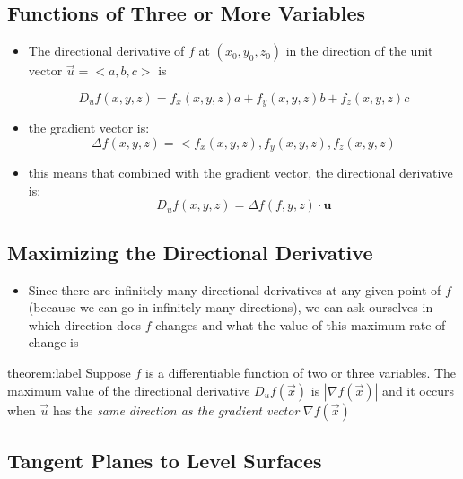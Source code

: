 \documentclass{package/notes}
\begin{document}
\subsection{Functions of Three or More Variables}

\begin{itemize}
	\item The directional derivative of $f$ at $(x_0, y_0, z_0)$ in the direction of the unit vector $\vec u = <a,b,c>$ is
	
	$$D_uf(x,y,z) = f_x(x,y,z)a + f_y(x,y,z)b + f_z(x,y,z)c$$

	\item the gradient vector is:
	$$\Delta f(x,y,z) = <f_x(x,y,z), f_y(x,y,z), f_z(x,y,z)$$

	\item this means that combined with the gradient vector, the directional derivative is:
	$$D_uf(x,y,z) = \Delta f(f,y,z) \cdot \mathbf{u}$$
\end{itemize}


\subsection{Maximizing the Directional Derivative}

\begin{itemize}
	\item Since there are infinitely many directional derivatives at any given point of $f$ (because we can go in infinitely many directions), we can ask ourselves in which direction does $f$ changes and what the value of this maximum rate of change is
\end{itemize}

\begin{theorem}{theorem:label}
	Suppose $f$ is a differentiable function of two or three variables. The maximum value of the directional derivative $D_uf(\vec x)$ is $|\nabla f(\vec x)|$ and it occurs when $\vec u$ has the \textit{same direction as the gradient vector} $\nabla f(\vec x)$
\end{theorem}


\subsection{Tangent Planes to Level Surfaces}
\end{document}
